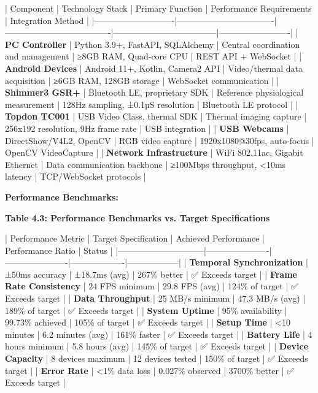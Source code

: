 \documentclass[12pt,a4paper]{article}
\begin{document}
| Component                  | Technology Stack                 | Primary Function                    | Performance Requirements           | Integration Method      |
|----------------------------|----------------------------------|-------------------------------------|------------------------------------|-------------------------|
| \textbf{PC Controller}          | Python 3.9+, FastAPI, SQLAlchemy | Central coordination and management | ≥8GB RAM, Quad-core CPU            | REST API + WebSocket    |
| \textbf{Android Devices}        | Android 11+, Kotlin, Camera2 API | Video/thermal data acquisition      | ≥6GB RAM, 128GB storage            | WebSocket communication |
| \textbf{Shimmer3 GSR+}          | Bluetooth LE, proprietary SDK    | Reference physiological measurement | 128Hz sampling, ±0.1µS resolution  | Bluetooth LE protocol   |
| \textbf{Topdon TC001}           | USB Video Class, thermal SDK     | Thermal imaging capture             | 256x192 resolution, 9Hz frame rate | USB integration         |
| \textbf{USB Webcams}            | DirectShow/V4L2, OpenCV          | RGB video capture                   | 1920x1080@30fps, auto-focus        | OpenCV VideoCapture     |
| \textbf{Network Infrastructure} | WiFi 802.11ac, Gigabit Ethernet  | Data communication backbone         | ≥100Mbps throughput, <10ms latency | TCP/WebSocket protocols |

\textbf{Performance Benchmarks:}

\textbf{Table 4.3: Performance Benchmarks vs. Target Specifications}

| Performance Metric           | Target Specification | Achieved Performance | Performance Ratio | Status           |
|------------------------------|----------------------|----------------------|-------------------|------------------|
| \textbf{Temporal Synchronization} | ±50ms accuracy       | ±18.7ms (avg)        | 267\% better       | ✅ Exceeds target |
| \textbf{Frame Rate Consistency}   | 24 FPS minimum       | 29.8 FPS (avg)       | 124\% of target    | ✅ Exceeds target |
| \textbf{Data Throughput}          | 25 MB/s minimum      | 47.3 MB/s (avg)      | 189\% of target    | ✅ Exceeds target |
| \textbf{System Uptime}            | 95\% availability     | 99.73\% achieved      | 105\% of target    | ✅ Exceeds target |
| \textbf{Setup Time}               | <10 minutes          | 6.2 minutes (avg)    | 161\% faster       | ✅ Exceeds target |
| \textbf{Battery Life}             | 4 hours minimum      | 5.8 hours (avg)      | 145\% of target    | ✅ Exceeds target |
| \textbf{Device Capacity}          | 8 devices maximum    | 12 devices tested    | 150\% of target    | ✅ Exceeds target |
| \textbf{Error Rate}               | <1\% data loss        | 0.027\% observed      | 3700\% better      | ✅ Exceeds target |
\end{document}

